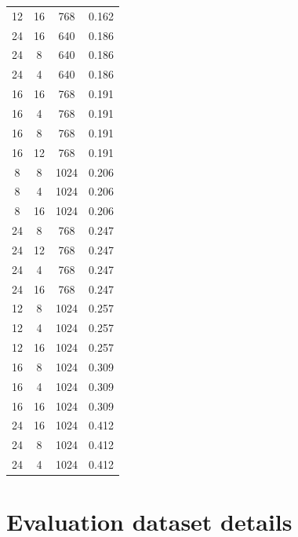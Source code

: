 \documentclass[dvipsnames,11pt]{article}
\begin{document}
\begin{appendix}
\begin{table}[tp]
\begin{tabular}{cccc}
12 & 16 & 768 & 0.162\\
24 & 16 & 640 & 0.186\\
24 & 8 & 640 & 0.186\\
24 & 4 & 640 & 0.186\\
16 & 16 & 768 & 0.191\\
16 & 4 & 768 & 0.191\\
16 & 8 & 768 & 0.191\\
16 & 12 & 768 & 0.191\\
8 & 8 & 1024 & 0.206\\
8 & 4 & 1024 & 0.206\\
8 & 16 & 1024 & 0.206\\
24 & 8 & 768 & 0.247\\
24 & 12 & 768 & 0.247\\
24 & 4 & 768 & 0.247\\
24 & 16 & 768 & 0.247\\
12 & 8 & 1024 & 0.257\\
12 & 4 & 1024 & 0.257\\
12 & 16 & 1024 & 0.257\\
16 & 8 & 1024 & 0.309\\
16 & 4 & 1024 & 0.309\\
16 & 16 & 1024 & 0.309\\
24 & 16 & 1024 & 0.412\\
24 & 8 & 1024 & 0.412\\
24 & 4 & 1024 & 0.412\\
\bottomrule
\end{tabular}
\label{tab:grid_full}
\end{table}

\section{Evaluation dataset details}
\label{appx:eval_data}


\end{appendix}
\end{document}
